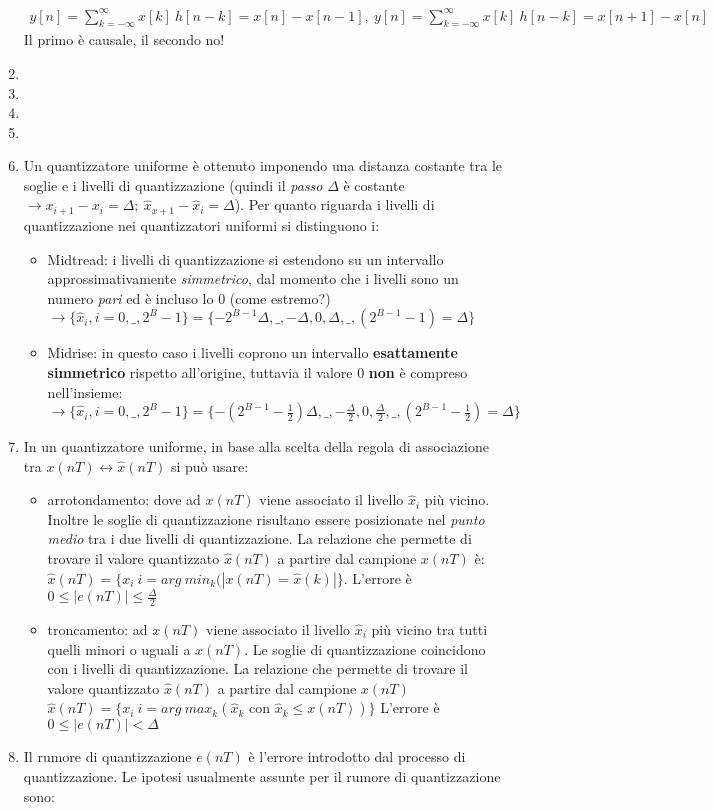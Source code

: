 \documentclass[
]{article}
\begin{document}
\begin{enumerate}
\begin{align*}
  y[n] = \sum_{k=-\infty}^{\infty}x[k] \ h[n-k] = x[n] - x[n-1], \ y[n] = \sum_{k=-\infty}^{\infty}x[k] \ h[n-k] = x[n+1] - x[n] 
  \end{align*} Il primo è causale, il secondo no!
\item
\item
\item
\item
\item
  Un quantizzatore uniforme è ottenuto imponendo una distanza costante
  tra le soglie e i livelli di quantizzazione (quindi il \emph{passo}
  \(\Delta\) è costante
  \(\to x_{i+1}-x_i=\Delta; \ \hat{x}_{x+1}-\hat{x}_i = \Delta\)). Per
  quanto riguarda i livelli di quantizzazione nei quantizzatori uniformi
  si distinguono i:

  \begin{itemize}
  \item
    Midtread: i livelli di quantizzazione si estendono su un intervallo
    approssimativamente \emph{simmetrico}, dal momento che i livelli
    sono un numero \emph{pari} ed è incluso lo 0 (come estremo?)
    \(\to \{\hat{x}_i,i=0,\_,2^B -1\}= \{-2^{B-1}\Delta,\_,-\Delta,0,\Delta,\_,(2^{B-1}-1)=\Delta \}\)
  \item
    Midrise: in questo caso i livelli coprono un intervallo
    \textbf{esattamente simmetrico} rispetto all'origine, tuttavia il
    valore 0 \textbf{non} è compreso
    nell'insieme:\(\to \{\hat{x}_i,i=0,\_,2^B -1\}= \{-(2^{B-1}-\frac{1}{2})\Delta,\_,-\frac{\Delta}{2},0,\frac{\Delta}{2},\_,(2^{B-1}-\frac{1}{2})=\Delta \}\)
  \end{itemize}
\item
  In un quantizzatore uniforme, in base alla scelta della regola di
  associazione tra \(x(nT)\leftrightarrow \hat{x}(nT)\) si può usare:

  \begin{itemize}
  \item
    arrotondamento: dove ad \(x(nT)\) viene associato il livello
    \(\hat{x}_i\) più vicino. Inoltre le soglie di quantizzazione
    risultano essere posizionate nel \emph{punto medio} tra i due
    livelli di quantizzazione. La relazione che permette di trovare il
    valore quantizzato \(\hat{x}(nT)\) a partire dal campione \(x(nT)\)
    è: \(\hat{x}(nT) = \{x_i \: i=arg \ min_k (|x(nT)=\hat{x}(k)| \}\).
    L'errore è \(0 \leq |e(nT)| \leq \frac{\Delta}{2}\)
  \item
    troncamento: ad \(x(nT)\) viene associato il livello \(\hat{x}_i\)
    più vicino tra tutti quelli minori o uguali a \(x(nT)\). Le soglie
    di quantizzazione coincidono con i livelli di quantizzazione. La
    relazione che permette di trovare il valore quantizzato
    \(\hat{x}(nT)\) a partire dal campione \(x(nT)\)
    \(\hat{x}(nT) = \{x_i \: i=arg \ max_k (\hat{x}_k \text{ con } \hat{x}_k \leq x(nT)) \}\)
    L'errore è \(0 \leq |e(nT)| < \Delta\)
  \end{itemize}
\item
  Il rumore di quantizzazione \(e(nT)\) è l'errore introdotto dal
  processo di quantizzazione. Le ipotesi usualmente assunte per il
  rumore di quantizzazione sono:


\end{enumerate}
\end{document}
